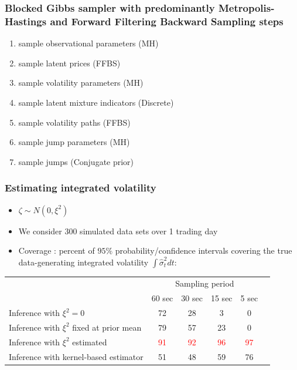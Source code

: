 \documentclass{beamer}
\begin{document}
\begin{frame}
  \frametitle{Blocked Gibbs sampler with predominantly Metropolis-Hastings and Forward Filtering Backward Sampling steps}
  \begin{enumerate}
  \item sample observational parameters (MH)
  \item sample latent prices (FFBS)
  \item sample volatility parameters (MH)
  \item sample latent mixture indicators (Discrete)
  \item sample volatility paths (FFBS)
  \item sample jump parameters (MH)
  \item sample jumps (Conjugate prior)
  \end{enumerate}
\end{frame}
\begin{frame}
  \frametitle{Estimating integrated volatility}
  \begin{itemize}
  \item
    $\zeta \sim N(0, \xi^2)$
    \item We consider 300 simulated data sets over 1 trading day
  
    \item Coverage : percent of $95\%$ probability/confidence intervals
      covering the true data-generating integrated volatility
      $\int \hat{\sigma}^2_t dt$:
  \end{itemize}
  \begin{table}[h]
    \begin{center}
      \begin{tabular}{l|ccccc}
        \hline
        & \multicolumn{4}{c}{Sampling period} \\
        &   	60 sec 	&   30 sec   &   15 sec & 5 sec  \\ \hline \hline
        Inference with $\xi^2 = 0$   &  72  &   28  &	 3 & 0 \\
        Inference with $\xi^2$ fixed at prior mean &  79 & 57 & 23 & 0 \\
        Inference with $\xi^2$ estimated & \textcolor{red}{91} & \textcolor{red}{92} & \textcolor{red}{96} & \textcolor{red}{97}  \\ \hline
        Inference with kernel-based estimator &  51 & 48 & 59  & 76 \\
        \hline
      \end{tabular}
    \end{center}
  \end{table}
\end{frame}
\end{document}
